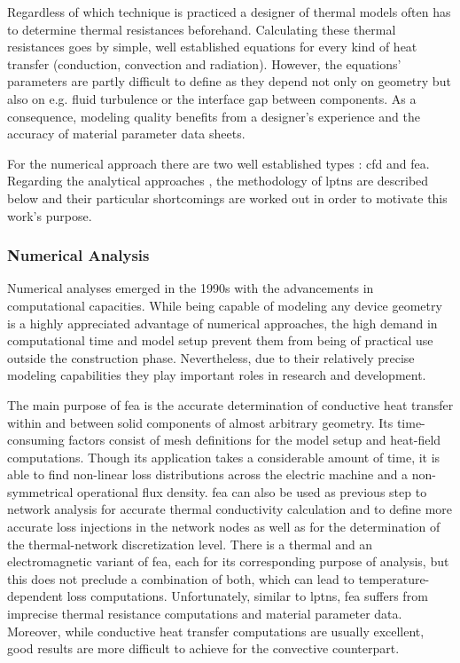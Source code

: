 Regardless of which technique is practiced a designer of thermal models often has to determine thermal resistances beforehand.
Calculating these thermal resistances goes by simple, well established equations for every kind of heat transfer (conduction, convection and radiation).
However, the equations' parameters are partly difficult to define as they depend not only on geometry but also on e.g. fluid turbulence or the interface gap between components.
As a consequence, modeling quality benefits from a designer's experience and the accuracy of material parameter data sheets.

For the numerical approach there are two well established types \cite{BoCa2009}: \gls{cfd} and \gls{fea}.
Regarding the analytical approaches \cite{BoCa2009, MeRo1991, WaBo2016}, the methodology of \glspl{lptn} are described below and their particular shortcomings are worked out in order to motivate this work's purpose.

\subsubsection{Numerical Analysis}
Numerical analyses emerged in the 1990s with the advancements in computational capacities.  
While being capable of modeling any device geometry is a highly appreciated advantage of numerical approaches, the high demand in computational time and model setup prevent them from being of practical use outside the construction phase.
Nevertheless, due to their relatively precise modeling capabilities they play important roles in research and development.

The main purpose of \gls{fea} is the accurate determination of conductive heat transfer within and between solid components of almost arbitrary geometry.
Its time-consuming factors consist of mesh definitions for the model setup and heat-field computations.
Though its application takes a considerable amount of time, it is able to find non-linear loss distributions across the electric machine and a non-symmetrical operational flux density. 
\gls{fea} can also be used as previous step to network analysis for accurate thermal conductivity calculation and to define more accurate loss injections in the network nodes as well as for the determination of the thermal-network discretization level.
There is a thermal and an electromagnetic variant of \gls{fea}, each for its corresponding purpose of analysis, but this does not preclude a combination of both, which can lead to temperature-dependent loss computations.
Unfortunately, similar to \glspl{lptn}, \gls{fea} suffers from imprecise thermal resistance computations and material parameter data.
Moreover, while conductive heat transfer computations are usually excellent, good results are more difficult to achieve for the convective counterpart.

